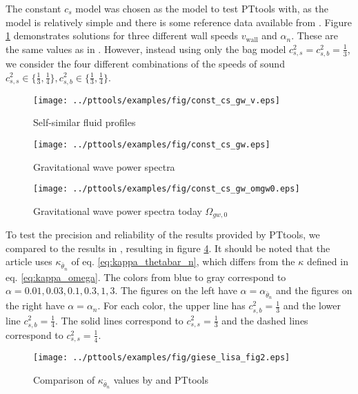 The constant $c_s$ model was chosen as the model to test PTtools with, as the model is relatively simple and there is some reference data available from \cites{giese_2020}{giese_2021}.
Figure \ref{fig:fluid_profiles} demonstrates solutions for three different wall speeds $v_\text{wall}$ and $\alpha_n$.
These are the same values as in \cite[fig. 10]{hindmarsh_gw_pt_2019}.
However, instead using only the bag model $c_{s,s}^2 = c_{s,b}^2 = \frac{1}{3}$,
we consider the four different combinations of the speeds of sound
$c_{s,s}^2 \in \{ \frac{1}{3}, \frac{1}{4} \}, c_{s,b}^2 \in \{ \frac{1}{3}, \frac{1}{4} \}$.

\begin{figure}[h!]
\centering
\texttt{[image: ../pttools/examples/fig/const\_cs\_gw\_v.eps]}
\caption{Self-similar fluid profiles}
\label{fig:fluid_profiles}
\end{figure}

\begin{figure}[h!]
\centering
\texttt{[image: ../pttools/examples/fig/const\_cs\_gw.eps]}
\caption{Gravitational wave power spectra}
\label{fig:gw_spectra}
\end{figure}

\begin{figure}[h!]
\centering
\texttt{[image: ../pttools/examples/fig/const\_cs\_gw\_omgw0.eps]}
\caption{Gravitational wave power spectra today $\Omega_{gw,0}$}
\label{fig:omgw0}
\end{figure}

To test the precision and reliability of the results provided by PTtools,
we compared to the results in \cite[fig. 2]{giese_2021},
resulting in figure \ref{fig:kappa_giese}.
It should be noted that the article uses $\kappa_{\bar{\theta}_n}$ of eq. \eqref{eq:kappa_thetabar_n},
which differs from the $\kappa$ defined in eq. \eqref{eq:kappa_omega}.
The colors from blue to gray correspond to $\alpha = 0.01, 0.03, 0.1, 0.3, 1, 3$.
The figures on the left have $\alpha = \alpha_{\bar{\theta}_n}$
and the figures on the right have $\alpha = \alpha_n$.
For each color, the upper line has $c_{s,b}^2 = \frac{1}{3}$ and the lower line $c_{s,b}^2 = \frac{1}{4}$.
The solid lines correspond to $c_{s,s}^2 = \frac{1}{3}$ and the dashed lines correspond to $c_{s,s}^2 = \frac{1}{4}$.

\begin{figure}[h!]
\centering
\texttt{[image: ../pttools/examples/fig/giese\_lisa\_fig2.eps]}
\caption{Comparison of $\kappa_{\bar{\theta}_n}$ values by \cite[fig. 2]{giese_2021} and PTtools}
\label{fig:kappa_giese}
\end{figure}

